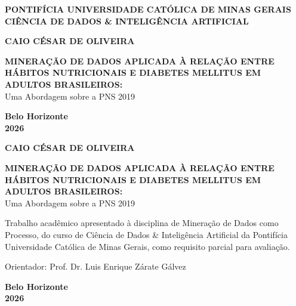 \documentclass[12pt, a4paper]{article}
\begin{document}
    \begin{titlepage}
        \centering
        \textbf{PONTIFÍCIA UNIVERSIDADE CATÓLICA DE MINAS GERAIS} \\
        \textbf{CIÊNCIA DE DADOS \& INTELIGÊNCIA ARTIFICIAL}
        
        \vspace{4cm}
        
        \textbf{CAIO CÉSAR DE OLIVEIRA}
        
        \vspace{4cm}
        
        \textbf{MINERAÇÃO DE DADOS APLICADA À RELAÇÃO ENTRE HÁBITOS NUTRICIONAIS E DIABETES MELLITUS EM ADULTOS BRASILEIROS:} \\
        Uma Abordagem sobre a PNS 2019
        
        \vfill
        
        \textbf{Belo Horizonte} \\
        \textbf{2026}
    \end{titlepage}

    \begin{titlepage}
        \centering
        \textbf{CAIO CÉSAR DE OLIVEIRA}
        
        \vspace{4cm}
        
        \textbf{MINERAÇÃO DE DADOS APLICADA À RELAÇÃO ENTRE HÁBITOS NUTRICIONAIS E DIABETES MELLITUS EM ADULTOS BRASILEIROS:} \\
        Uma Abordagem sobre a PNS 2019
        
        \vspace{3cm}
        
        \begin{flushright}
        \begin{minipage}{0.55\textwidth}
            \linespread{1.0}\selectfont
            Trabalho acadêmico apresentado à disciplina de Mineração de Dados como Processo, do curso de Ciência de Dados \& Inteligência Artificial da Pontifícia Universidade Católica de Minas Gerais, como requisito parcial para avaliação.
            
            \vspace{0.8cm}
            Orientador: Prof. Dr. Luis Enrique Zárate Gálvez
        \end{minipage}
        \end{flushright}
        
        \vfill
        
        \textbf{Belo Horizonte} \\
        \textbf{2026}
    \end{titlepage}
\end{document}
